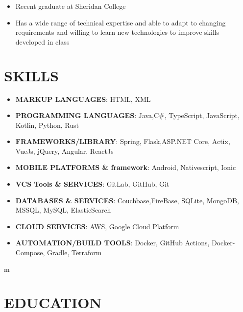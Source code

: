 \documentclass[10pt,a4paper,roman]{moderncv}
\begin{document}
{\begin{itemize}
\item Recent graduate at Sheridan College
\item Has a wide range of technical expertise and able to adapt to changing requirements and willing to learn new technologies to improve skills developed in class

\end{itemize}
\vspace*{-2.5mm}

\section{SKILLS}
\vspace*{-5mm}

   \begin{multicols}{2}
    \begin{itemize}
      \item \textbf{MARKUP LANGUAGES}: HTML, XML 
      \item \textbf{PROGRAMMING LANGUAGES}: Java,\newline C\#, TypeScript, JavaScript, Kotlin, Python, Rust
      \item \textbf{FRAMEWORKS/LIBRARY}: Spring, Flask,\newline ASP.NET Core, Actix, VueJs, jQuery, Angular, ReactJs

    \item \textbf{MOBILE PLATFORMS \& framework}: Android, Nativescript, Ionic
                     \item \textbf{VCS Tools \& SERVICES}: GitLab, GitHub, Git
      \item \textbf{DATABASES \& SERVICES}: Couchbase,\newline FireBase, SQLite, MongoDB, MSSQL, MySQL, ElasticSearch
                       \item \textbf{CLOUD SERVICES}: AWS, Google Cloud Platform
                       \item \textbf{AUTOMATION/BUILD TOOLS}: Docker, GitHub Actions, Docker-Compose, Gradle, Terraform

    \end{itemize}
    \end{multicols}m
\vspace*{-7mm}

\section{EDUCATION}
\vspace*{-1mm}

}
\end{document}
